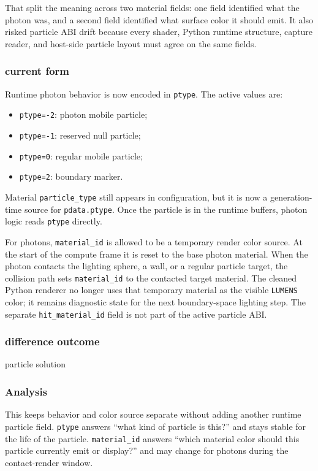 That split the meaning across two material fields: one field identified what
the photon was, and a second field identified what surface color it should
emit.  It also risked particle ABI drift because every shader, Python runtime
structure, capture reader, and host-side particle layout must agree on the
same fields.

\subsubsection{current form}

Runtime photon behavior is now encoded in \texttt{ptype}.  The active values
are:
\begin{itemize}
    \item \texttt{ptype=-2}: photon mobile particle;
    \item \texttt{ptype=-1}: reserved null particle;
    \item \texttt{ptype=0}: regular mobile particle;
    \item \texttt{ptype=2}: boundary marker.
\end{itemize}

Material \texttt{particle\_type} still appears in configuration, but it is now
a generation-time source for \texttt{pdata.ptype}.  Once the particle is in
the runtime buffers, photon logic reads \texttt{ptype} directly.

For photons, \texttt{material\_id} is allowed to be a temporary render color
source.  At the start of the compute frame it is reset to the base photon
material.  When the photon contacts the lighting sphere, a wall, or a regular
particle target, the collision path sets \texttt{material\_id} to the
contacted target material.  The cleaned Python renderer no longer uses that
temporary material as the visible \texttt{LUMENS} color; it remains diagnostic
state for the next boundary-space lighting step.  The separate
\texttt{hit\_material\_id} field is not part of the active particle ABI.

\subsubsection{difference outcome}

particle solution

\subsubsection{Analysis}

This keeps behavior and color source separate without adding another runtime
particle field.  \texttt{ptype} answers ``what kind of particle is this?''
and stays stable for the life of the particle.  \texttt{material\_id} answers
``which material color should this particle currently emit or display?'' and
may change for photons during the contact-render window.

